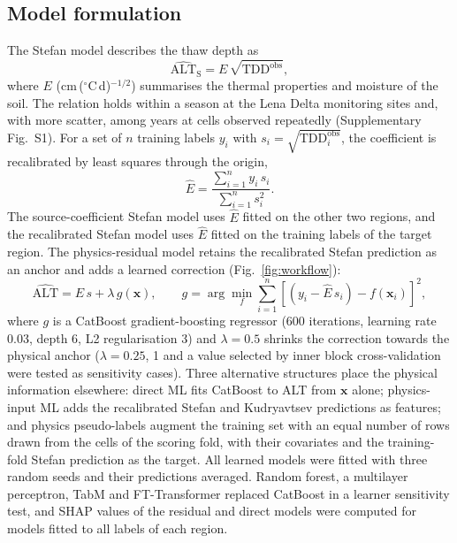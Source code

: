 \subsection{Model formulation}
The Stefan model describes the thaw depth as
\begin{equation}
\widehat{\mathrm{ALT}}_{\mathrm{S}} = E\,\sqrt{\mathrm{TDD}^{\mathrm{obs}}},
\label{eq:stefan}
\end{equation}
where $E$ (cm\,($^\circ$C\,d)$^{-1/2}$) summarises the thermal properties and moisture of the soil\cite{Stefan1891,Riseborough2008}. The relation holds within a season at the Lena Delta monitoring sites and, with more scatter, among years at cells observed repeatedly (Supplementary Fig.~S1). For a set of $n$ training labels $y_i$ with $s_i = \sqrt{\mathrm{TDD}^{\mathrm{obs}}_i}$, the coefficient is recalibrated by least squares through the origin,
\begin{equation}
\hat{E} = \frac{\sum_{i=1}^{n} y_i\, s_i}{\sum_{i=1}^{n} s_i^{2}}.
\label{eq:E}
\end{equation}
The source-coefficient Stefan model uses $\hat{E}$ fitted on the other two regions, and the recalibrated Stefan model uses $\hat{E}$ fitted on the training labels of the target region. The physics-residual model retains the recalibrated Stefan prediction as an anchor and adds a learned correction (Fig.~\ref{fig:workflow}):
\begin{equation}
\widehat{\mathrm{ALT}} = \hat{E}\, s + \lambda\, g(\mathbf{x}), \qquad g = \arg\min_{f} \sum_{i=1}^{n} \left[ \left( y_i - \hat{E}\, s_i \right) - f(\mathbf{x}_i) \right]^{2},
\label{eq:residual}
\end{equation}
where $g$ is a CatBoost gradient-boosting regressor\cite{Prokhorenkova2018} (600 iterations, learning rate 0.03, depth 6, L2 regularisation 3) and $\lambda=0.5$ shrinks the correction towards the physical anchor ($\lambda = 0.25$, 1 and a value selected by inner block cross-validation were tested as sensitivity cases). Three alternative structures place the physical information elsewhere: direct ML fits CatBoost to ALT from $\mathbf{x}$ alone; physics-input ML adds the recalibrated Stefan and Kudryavtsev\cite{Kudryavtsev1974} predictions as features; and physics pseudo-labels augment the training set with an equal number of rows drawn from the cells of the scoring fold, with their covariates and the training-fold Stefan prediction as the target. All learned models were fitted with three random seeds and their predictions averaged. Random forest, a multilayer perceptron, TabM and FT-Transformer\cite{Gorishniy2021,Gorishniy2025,Holzmuller2024} replaced CatBoost in a learner sensitivity test, and SHAP values\cite{Lundberg2017} of the residual and direct models were computed for models fitted to all labels of each region.

